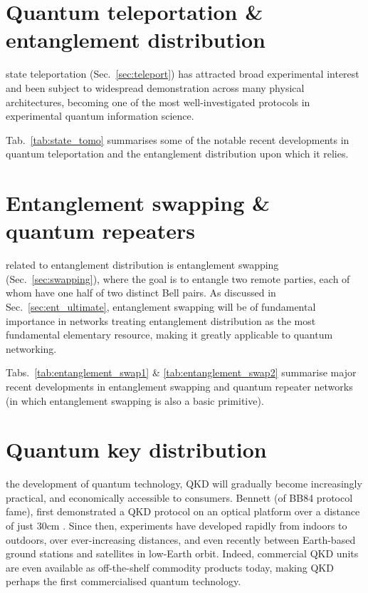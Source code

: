 %
%

\section{Quantum teleportation \& entanglement distribution}   

 state teleportation (Sec.~\ref{sec:teleport}) has attracted broad experimental interest and been subject to widespread demonstration across many physical architectures, becoming one of the most well-investigated protocols in experimental quantum information science. 

Tab.~\ref{tab:state_tomo} summarises some of the notable recent developments in quantum teleportation and the entanglement distribution upon which it relies.

%
%

\section{Entanglement swapping \& quantum repeaters}  

 related to entanglement distribution is entanglement swapping (Sec.~\ref{sec:swapping}), where the goal is to entangle two remote parties, each of whom have one half of two distinct Bell pairs. As discussed in Sec.~\ref{sec:ent_ultimate}, entanglement swapping will be of fundamental importance in networks treating entanglement distribution as the most fundamental elementary resource, making it greatly applicable to quantum networking. 

Tabs.~\ref{tab:entanglement_swap1} \& \ref{tab:entanglement_swap2} summarise major recent developments in entanglement swapping and quantum repeater networks (in which entanglement swapping is also a basic primitive).

%
%

\section{Quantum key distribution} \label{bib:QKD_state_of_art}

 the development of quantum technology, QKD will gradually become increasingly practical, and economically accessible to consumers. Bennett (of BB84 protocol fame), first demonstrated a QKD protocol on an optical platform over a distance of just 30cm \cite{bib:JC_5_3}. Since then, experiments have developed rapidly from indoors to outdoors, over ever-increasing distances, and even recently between Earth-based ground stations and satellites in low-Earth orbit. Indeed, commercial QKD units are even available as off-the-shelf commodity products today, making QKD perhaps the first commercialised quantum technology.

